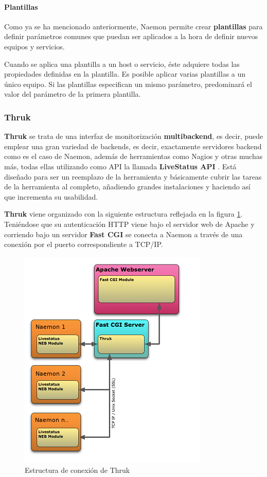 \paragraph{Plantillas}

Como ya se ha mencionado anteriormente, Naemon permite crear \textbf{plantillas} para definir parámetros comunes que puedan ser aplicados a la hora de definir nuevos equipos y servicios.

Cuando se aplica una plantilla a un host o servicio, éste adquiere todas las propiedades definidas en la plantilla. Es posible aplicar varias plantillas a un único equipo. Si las plantillas especifican un mismo parámetro, predominará el valor del parámetro de la primera plantilla.

\subsubsection{Thruk}

\textbf{Thruk}\cite{thruk} se trata de una interfaz de monitorización \textbf{multibackend}, es decir, puede emplear una gran variedad de backends, es decir, exactamente servidores backend como es el caso de Naemon, además de herramientas como Nagios y otras muchas más, todas ellas utilizando como API la llamada \textbf{LiveStatus API} \cite{livestatus}. Está diseñado para ser un reemplazo de la herramienta y básicamente cubrir las tareas de la herramienta al completo, añadiendo grandes instalaciones y haciendo así que incrementa su usabilidad.

\textbf{Thruk} viene organizado con la siguiente estructura reflejada en la figura \ref{thruk}. Teniéndose que su autenticación HTTP viene bajo el servidor web de Apache y corriendo bajo un servidor \textbf{Fast CGI} se conecta a Naemon a través de una conexión por el puerto correspondiente a TCP/IP.

\begin{figure}[H]
	\centering
	\includegraphics[scale=0.7]{imagenes/thruk/arquitectura.png}
	\caption{Estructura de conexión de Thruk} \label{thruk}
\end{figure}


